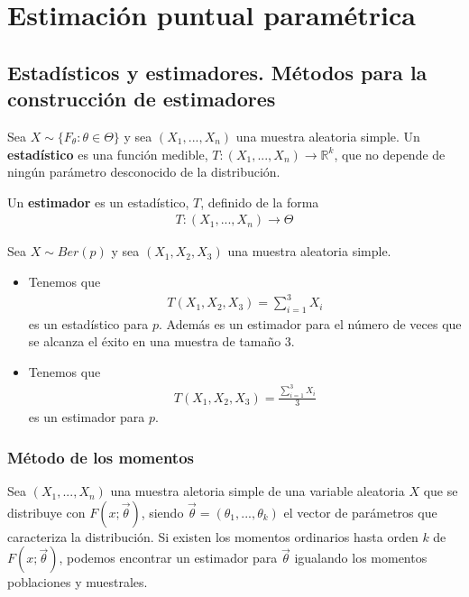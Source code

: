 \chapter{Estimación puntual paramétrica}

\section{Estadísticos y estimadores. Métodos para la construcción de estimadores}

\begin{defi}
Sea $X \sim \{ F_{\theta} : \theta \in \Theta  \}$ y sea $(X_1,...,X_n)$ una muestra aleatoria simple. Un \textbf{estadístico} es una función medible, $T : (X_1,...,X_n) \longrightarrow \mathbb{R}^k$, que no depende de ningún parámetro desconocido de la distribución.
\end{defi}

\begin{defi}
Un \textbf{estimador} es un estadístico, $T$, definido de la forma
\begin{align*}
    T: (X_1,...,X_n) \longrightarrow \Theta
\end{align*}
\end{defi}

\begin{ejemplo}
Sea $X \sim Ber(p)$ y sea $(X_1,X_2,X_3)$ una muestra aleatoria simple.
\begin{itemize}
    \item Tenemos que
    \begin{align*}
        T(X_1,X_2,X_3) = \sum_{i=1}^{3}{X_i}
    \end{align*}
    es un estadístico para $p$. Además es un estimador para el número de veces que se alcanza el éxito en una muestra de tamaño 3.
    \item Tenemos que
    \begin{align*}
        T(X_1,X_2,X_3) = \frac{\sum_{i=1}^{3}{X_i}}{3}
    \end{align*}
    es un estimador para $p$.
\end{itemize}
\end{ejemplo}

\subsection{Método de los momentos}

\begin{defi}
Sea $(X_1,...,X_n)$ una muestra aletoria simple de una variable aleatoria $X$ que se distribuye con $F(x;\overrightarrow{\theta})$, siendo $\overrightarrow{\theta} =(\theta_1,...,\theta_k)$ el vector de parámetros que caracteriza la distribución. Si existen los momentos ordinarios hasta orden $k$ de $F(x;\overrightarrow{\theta})$, podemos encontrar un estimador para $\overrightarrow{\theta}$ igualando los momentos poblaciones y muestrales.
\end{defi}

